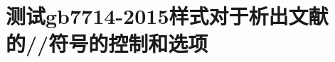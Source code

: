 \documentclass[twoside]{article}
\begin{document}
    \section{测试gb7714-2015样式对于析出文献的//符号的控制和选项}

    \nocite{*}
    \printbibliography

    
\end{document}
